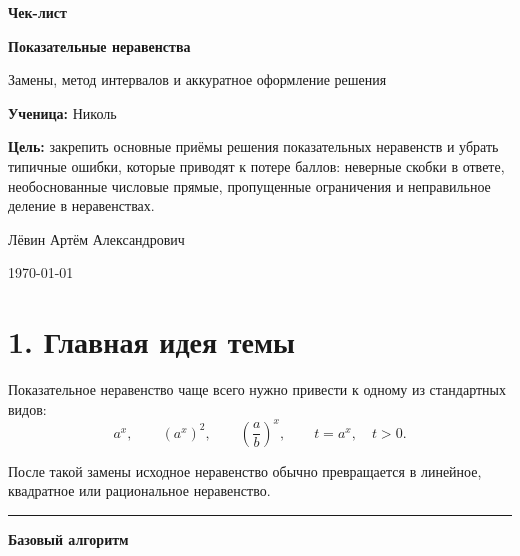 \documentclass[a4paper,12pt]{article}
\newcommand{\sectionline}{%
  \vspace{2mm}
  \noindent\textcolor{lightline}{\rule{\linewidth}{0.8pt}}
  \vspace{1mm}
}
\begin{document}
\begin{titlepage}
\thispagestyle{empty}

\vspace*{18mm}

{\Huge\bfseries\textcolor{darkaccent}{Чек-лист}}

\vspace{8mm}

{\Large\bfseries Показательные неравенства}

\vspace{4mm}

{\large Замены, метод интервалов и аккуратное оформление решения}

\vspace{18mm}

\textbf{Ученица:} Николь

\vspace{6mm}

\textbf{Цель:} закрепить основные приёмы решения показательных неравенств и убрать типичные ошибки, которые приводят к потере баллов: неверные скобки в ответе, необоснованные числовые прямые, пропущенные ограничения и неправильное деление в неравенствах.

\vfill

{\large Лёвин Артём Александрович}

\vspace{4mm}

{\large \today}

\vspace*{15mm}

\end{titlepage}

\section*{1. Главная идея темы}

Показательное неравенство чаще всего нужно привести к одному из стандартных видов:
\[
a^x,\qquad (a^x)^2,\qquad \left(\frac ab\right)^x,\qquad t=a^x,\quad t>0.
\]

После такой замены исходное неравенство обычно превращается в линейное, квадратное или рациональное неравенство.

\sectionline

\textbf{Базовый алгоритм}
\end{document}
